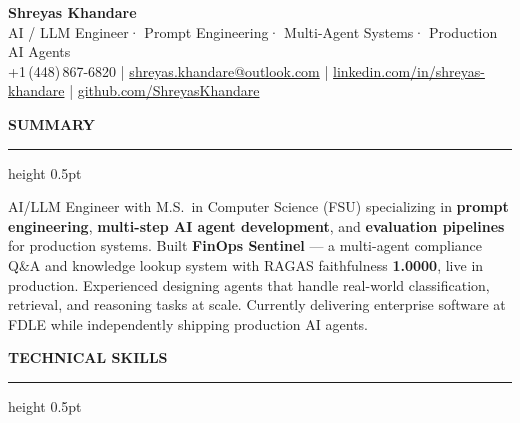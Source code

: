 \documentclass[10pt, letterpaper]{article}
\newcommand{\resumesection}[1]{%
  \vspace{8pt}%
  {\large\bfseries\color{navy} #1}%
  \vspace{2pt}%
  \hrule height 0.5pt \color{navy}%
  \vspace{4pt}%
}
\begin{document}

\begin{center}
  {\fontsize{20pt}{22pt}\selectfont\bfseries\color{navy} Shreyas Khandare}\\[4pt]
  {\fontsize{10pt}{13pt}\selectfont\color{mutedtext}
    AI / LLM Engineer\enspace\textcolor{midblue}{·}\enspace
    Prompt Engineering\enspace\textcolor{midblue}{·}\enspace
    Multi-Agent Systems\enspace\textcolor{midblue}{·}\enspace
    Production AI Agents}\\[5pt]
  {\fontsize{8.5pt}{11pt}\selectfont\color{mutedtext}
    +1\,(448)\,867-6820
    \enspace\textcolor{midblue}{|}\enspace
    \href{mailto:shreyas.khandare@outlook.com}{shreyas.khandare@outlook.com}
    \enspace\textcolor{midblue}{|}\enspace
    \href{https://linkedin.com/in/shreyas-khandare}{linkedin.com/in/shreyas-khandare}
    \enspace\textcolor{midblue}{|}\enspace
    \href{https://github.com/ShreyasKhandare}{github.com/ShreyasKhandare}
  }
\end{center}

\vspace{-2pt}

\resumesection{SUMMARY}

{\fontsize{9.5pt}{13pt}\selectfont\color{darktext}
AI/LLM Engineer with M.S.\ in Computer Science (FSU) specializing in \textbf{prompt engineering},
\textbf{multi-step AI agent development}, and \textbf{evaluation pipelines} for production systems.
Built \textbf{FinOps Sentinel} --- a multi-agent compliance Q\&A and knowledge lookup system with
RAGAS faithfulness \textbf{1.0000}, live in production. Experienced designing agents that handle
real-world classification, retrieval, and reasoning tasks at scale. Currently delivering enterprise
software at FDLE while independently shipping production AI agents.
}

\resumesection{TECHNICAL SKILLS}
\end{document}

